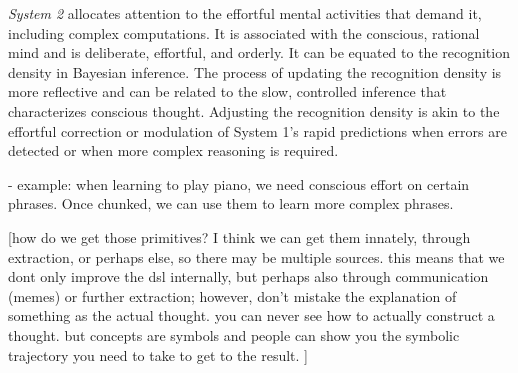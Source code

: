 \emph{System 2} allocates attention to the effortful mental activities that demand it, including complex computations. It is associated with the conscious, rational mind and is deliberate, effortful, and orderly. It can be equated to the recognition density in Bayesian inference. The process of updating the recognition density is more reflective and can be related to the slow, controlled inference that characterizes conscious thought. Adjusting the recognition density is akin to the effortful correction or modulation of System 1's rapid predictions when errors are detected or when more complex reasoning is required.

- example: when learning to play piano, we need conscious effort on certain phrases. Once chunked, we can use them to learn more complex phrases.


\cite{Lake_Ullman_Tenenbaum_Gershman_2017}


[how do we get those primitives? I think we can get them innately, through extraction, or perhaps else, so there may be multiple sources. this means that we dont only improve the dsl internally, but perhaps also through communication (memes) or further extraction; however, don't mistake the explanation of something as the actual thought. you can never see how to actually construct a thought. but concepts are symbols and people can show you the symbolic trajectory you need to take to get to the result. ]
